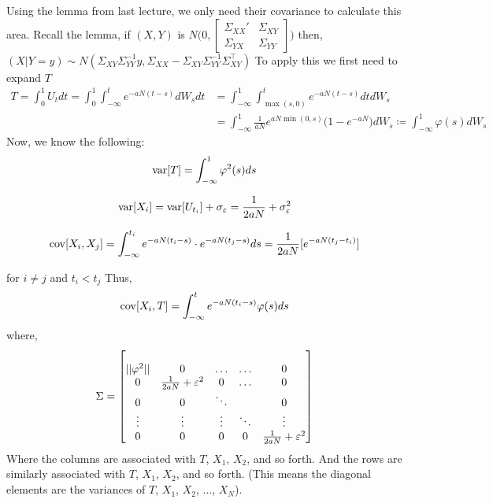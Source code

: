 \documentclass[../../../Master/AppliedStochastics.tex]{subfiles}
\begin{document}
Using the lemma from last lecture, 
we only need their covariance to calculate this area.
Recall the lemma,
if $(X,Y)$ is $N\Bigg(0, \begin{bmatrix} \Sigma_{XX}' & \Sigma_{XY} \\ \Sigma_{YX} & \Sigma_{YY}\end{bmatrix}\Bigg)$
then, $(X\vert Y=y) \sim N(\Sigma_{XY}\Sigma_{YY}^{-1}y, \Sigma_{XX}-\Sigma_{XY}\Sigma_{YY}^{-1}\Sigma_{XY}^{\intercal})$
To apply this we first need to expand $T$ 
$$\begin{aligned}
T = \int_{0}^{1} U_{t}dt = \int_{0}^{1}\int_{-\infty}^{t} e^{-aN(t-s)} dW_{s}dt 
&=\int_{-\infty}^{1}\int_{\max(s,0)}^{t} e^{-aN(t-s)} dtdW_{s}\\
&=\int_{-\infty}^{1} \frac{1}{aN}e^{aN\min(0,s)}\big(1-e^{-aN}\big)dW_{s}\coloneqq \int_{-\infty}^{1}\varphi(s)dW_{s}
\end{aligned}$$ 
Now, we know the following: 
$$\begin{aligned}
\var[T] = \int_{-\infty}^{1} \varphi^{2}(s) ds 
\end{aligned}$$ 

$$\begin{aligned}
\operatorname{var}[X_{i}] = \operatorname{var}[U_{t_{i}}] + \sigma_{\varepsilon} = \frac{1}{2aN} + \sigma_{\varepsilon}^2 
\end{aligned}$$ 

$$\begin{aligned}
\operatorname{cov}[X_{i}, X_{j}] = \int_{-\infty}^{t_{i}}e^{-aN(t_{i}-s)}\cdot e^{-aN(t_{j}-s)} ds = \frac{1}{2aN}[e^{-aN(t_{j}-t_{i})}]
\end{aligned}$$

for $i\neq j$ and $t_{i}<t_{j}$ 
Thus, 
$$\begin{aligned}
\cov[X_{i}, T] = \int_{-\infty}^{t} e^{-aN(t_{i}-s)}\varphi(s) ds 
\end{aligned}$$
where, 
$$\begin{aligned}
\Sigma = 
\begin{bmatrix}
&  &  &  &  \\
\vert\vert\varphi^2\vert\vert & 0 & \dotso & \dotso & 0 \\
0 & \frac{1}{2aN}+\varepsilon^2 & 0 & \dotso & 0 \\
0 & 0 & \ddots & \hfill & 0\\
\vdots & \vdots & \vdots & \ddots & \vdots \\
0 & 0 & 0 & 0 & \frac{1}{2aN}+\varepsilon^2
\end{bmatrix}
\end{aligned}$$
Where the columns are associated with $T$, $X_{1}$, $X_{2}$, and so forth. 
And the rows are similarly associated with $T$, $X_{1}$, $X_{2}$, and so forth. 
(This means the diagonal elements are the variances of $T$, $X_{1}$, $X_{2}$, $\dotso$, $X_N$).
%
\end{document}
